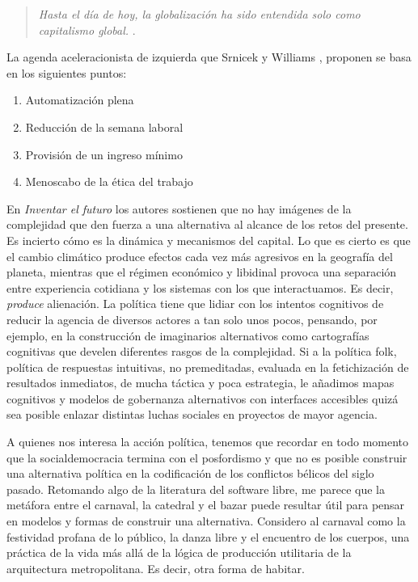 \begin{quote}
  \emph{Hasta el día de hoy, la globalización ha sido entendida solo como capitalismo global.} \autocite{huiUnhappyConsciousnessNeoreactionaries2017}.
\end{quote}

La agenda aceleracionista de izquierda que Srnicek y Williams \autocite[p.~185]{srnicekInventarFuturoPoscapitalismo2017}, proponen se basa en los siguientes puntos:

\begin{enumerate}[labelindent=\parindent, leftmargin=*, label=\roman*., widest=iii, align=left]
  \item Automatización plena
  \item Reducción de la semana laboral
  \item Provisión de un ingreso mínimo
  \item Menoscabo de la ética del trabajo
\end{enumerate}

En \emph{Inventar el futuro} los autores sostienen que no hay imágenes de la complejidad que den fuerza a una alternativa al alcance de los retos del presente. Es incierto cómo es la dinámica y mecanismos del capital. Lo que es cierto es que el cambio climático produce efectos cada vez más agresivos en la geografía del planeta, mientras que el régimen económico y libidinal provoca una separación entre experiencia cotidiana y los sistemas con los que interactuamos. Es decir, \emph{produce} alienación. La política tiene que lidiar con los intentos cognitivos de reducir la agencia de diversos actores a tan solo unos pocos, pensando, por ejemplo, en la construcción de imaginarios alternativos como cartografías cognitivas que develen diferentes rasgos de la complejidad. Si a la política folk, política de respuestas intuitivas, no premeditadas, evaluada en la fetichización de resultados inmediatos, de mucha táctica y poca estrategia, le añadimos mapas cognitivos y modelos de gobernanza alternativos con interfaces accesibles quizá sea posible enlazar distintas luchas sociales en proyectos de mayor agencia.

A quienes nos interesa la acción política, tenemos que recordar en todo momento que la socialdemocracia termina con el posfordismo y que no es posible construir una alternativa política en la codificación de los conflictos bélicos del siglo pasado. Retomando algo de la literatura del software libre, me parece que la metáfora entre el carnaval, la catedral y el bazar puede resultar útil para pensar en modelos y formas de construir una alternativa. Considero al carnaval como la festividad profana de lo público, la danza libre y el encuentro de los cuerpos, una práctica de la vida más allá de la lógica de producción utilitaria de la arquitectura metropolitana. Es decir, otra forma de habitar.

